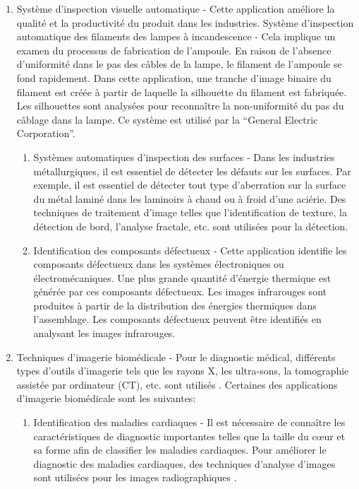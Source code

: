 \documentclass[12pt]{article}
\begin{document}
\begin{enumerate}
	\item Système d'inspection visuelle automatique - Cette application améliore la qualité et la productivité du produit dans les industries. Système d’inspection automatique des filaments des lampes à incandescence - Cela implique un examen du processus de fabrication de l'ampoule. En raison de l’absence d’uniformité dans le pas des câbles de la lampe, le filament de l’ampoule se fond rapidement. Dans cette application, une tranche d'image binaire du filament est créée à partir de laquelle la silhouette du filament est fabriquée. Les silhouettes sont analysées pour reconnaître la non-uniformité du pas du câblage dans la lampe. Ce système est utilisé par la “General Electric Corporation”.
	\begin{enumerate}
		\item Systèmes automatiques d'inspection des surfaces - Dans les industries métallurgiques, il est essentiel de détecter les défauts sur les surfaces. Par exemple, il est essentiel de détecter tout type d'aberration sur la surface du métal laminé dans les laminoirs à chaud ou à froid d'une aciérie. Des techniques de traitement d'image telles que l'identification de texture, la détection de bord, l'analyse fractale, etc. sont utilisées pour la détection.
		\item Identification des composants défectueux - Cette application identifie les composants défectueux dans les systèmes électroniques ou électromécaniques. Une plus grande quantité d'énergie thermique est générée par ces composants défectueux. Les images infrarouges sont produites à partir de la distribution des énergies thermiques dans l'assemblage. Les composants défectueux peuvent être identifiés en analysant les images infrarouges.
	\end{enumerate}
	\item Techniques d'imagerie biomédicale - Pour le diagnostic médical, différents types d'outils d'imagerie tels que les rayons X, les ultra-sons, la tomographie assistée par ordinateur (CT), etc. sont utilisés \cite{19}. Certaines des applications d'imagerie biomédicale sont les suivantes:
	\begin{enumerate}
		\item Identification des maladies cardiaques - Il est nécessaire de connaître les caractéristiques de diagnostic importantes telles que la taille du cœur et sa forme afin de classifier les maladies cardiaques. Pour améliorer le diagnostic des maladies cardiaques, des techniques d'analyse d'images sont utilisées pour les images radiographiques \cite{20} \cite{21}.

\end{enumerate}
\end{enumerate}
\end{document}
